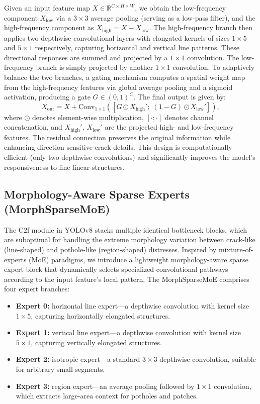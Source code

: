 \documentclass{ieeeaccess}
\begin{document}
{Given an input feature map $X \in \mathbb{R}^{C \times H \times W}$, we obtain the low-frequency component $X_{\text{low}}$ via a $3\times3$ average pooling (serving as a low-pass filter), and the high-frequency component as $X_{\text{high}} = X - X_{\text{low}}$. The high-frequency branch then applies two depthwise convolutional layers with elongated kernels of sizes $1\times5$ and $5\times1$ respectively, capturing horizontal and vertical line patterns. These directional responses are summed and projected by a $1\times1$ convolution. The low-frequency branch is simply projected by another $1\times1$ convolution. To adaptively balance the two branches, a gating mechanism computes a spatial weight map from the high-frequency features via global average pooling and a sigmoid activation, producing a gate $G \in (0,1)^C$. The final output is given by:
\begin{equation}
X_{\text{out}} = X + \text{Conv}_{1\times1}\left( \left[ G \odot X_{\text{high}}';\; (1-G) \odot X_{\text{low}}' \right] \right),
\end{equation}
where $\odot$ denotes element-wise multiplication, $[\cdot;\cdot]$ denotes channel concatenation, and $X_{\text{high}}'$, $X_{\text{low}}'$ are the projected high- and low-frequency features. The residual connection preserves the original information while enhancing direction-sensitive crack details. This design is computationally efficient (only two depthwise convolutions) and significantly improves the model's responsiveness to fine linear structures.

\subsection{Morphology-Aware Sparse Experts (MorphSparseMoE)}

The C2f module in YOLOv8 stacks multiple identical bottleneck blocks, which are suboptimal for handling the extreme morphology variation between crack-like (line-shaped) and pothole-like (region-shaped) distresses. Inspired by mixture-of-experts (MoE) paradigms, we introduce a lightweight morphology-aware sparse expert block that dynamically selects specialized convolutional pathways according to the input feature's local pattern. The MorphSparseMoE comprises four expert branches:

\begin{itemize}
\item \textbf{Expert 0:} horizontal line expert---a depthwise convolution with kernel size $1\times5$, capturing horizontally elongated structures.
\item \textbf{Expert 1:} vertical line expert---a depthwise convolution with kernel size $5\times1$, capturing vertically elongated structures.
\item \textbf{Expert 2:} isotropic expert---a standard $3\times3$ depthwise convolution, suitable for arbitrary small segments.
\item \textbf{Expert 3:} region expert---an average pooling followed by $1\times1$ convolution, which extracts large-area context for potholes and patches.
\end{itemize}

}
\end{document}
